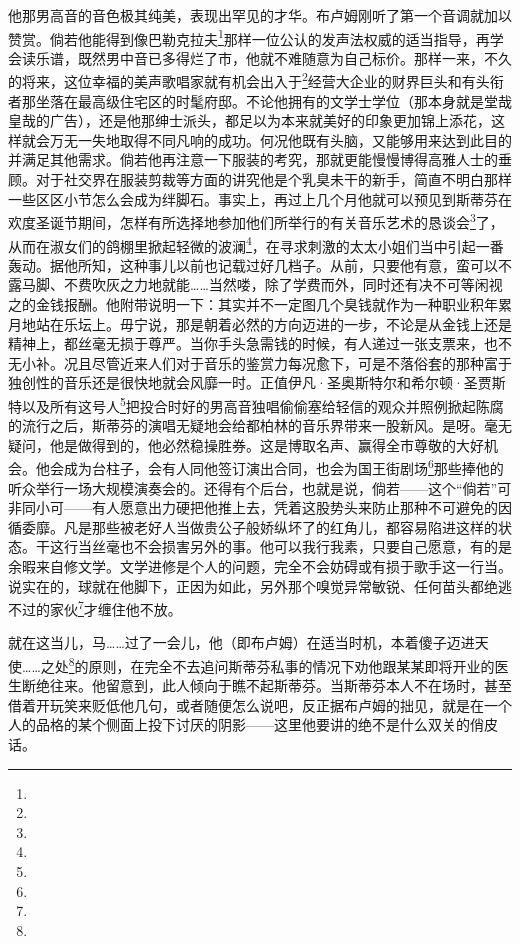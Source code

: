 \par 他那男高音的音色极其纯美，表现出罕见的才华。布卢姆刚听了第一个音调就加以赞赏。倘若他能得到像巴勒克拉夫\footnote{}那样一位公认的发声法权威的适当指导，再学会读乐谱，既然男中音已多得烂了市，他就不难随意为自己标价。那样一来，不久的将来，这位幸福的美声歌唱家就有机会出入于\footnote{}经营大企业的财界巨头和有头衔者那坐落在最高级住宅区的时髦府邸。不论他拥有的文学士学位（那本身就是堂哉皇哉的广告），还是他那绅士派头，都足以为本来就美好的印象更加锦上添花，这样就会万无一失地取得不同凡响的成功。何况他既有头脑，又能够用来达到此目的并满足其他需求。倘若他再注意一下服装的考究，那就更能慢慢博得高雅人士的垂顾。对于社交界在服装剪裁等方面的讲究他是个乳臭未干的新手，简直不明白那样一些区区小节怎么会成为绊脚石。事实上，再过上几个月他就可以预见到斯蒂芬在欢度圣诞节期间，怎样有所选择地参加他们所举行的有关音乐艺术的恳谈会\footnote{}了，从而在淑女们的鸽棚里掀起轻微的波澜\footnote{}，在寻求刺激的太太小姐们当中引起一番轰动。据他所知，这种事儿以前也记载过好几档子。从前，只要他有意，蛮可以不露马脚、不费吹灰之力地就能……当然喽，除了学费而外，同时还有决不可等闲视之的金钱报酬。他附带说明一下：其实并不一定图几个臭钱就作为一种职业积年累月地站在乐坛上。毋宁说，那是朝着必然的方向迈进的一步，不论是从金钱上还是精神上，都丝毫无损于尊严。当你手头急需钱的时候，有人递过一张支票来，也不无小补。况且尽管近来人们对于音乐的鉴赏力每况愈下，可是不落俗套的那种富于独创性的音乐还是很快地就会风靡一时。正值伊凡·圣奥斯特尔和希尔顿·圣贾斯特以及所有这号人\footnote{}把投合时好的男高音独唱偷偷塞给轻信的观众并照例掀起陈腐的流行之后，斯蒂芬的演唱无疑地会给都柏林的音乐界带来一股新风。是呀。毫无疑问，他是做得到的，他必然稳操胜券。这是博取名声、赢得全市尊敬的大好机会。他会成为台柱子，会有人同他签订演出合同，也会为国王街剧场\footnote{}那些捧他的听众举行一场大规模演奏会的。还得有个后台，也就是说，倘若——这个“倘若”可非同小可——有人愿意出力硬把他推上去，凭着这股势头来防止那种不可避免的因循委靡。凡是那些被老好人当做贵公子般娇纵坏了的红角儿，都容易陷进这样的状态。干这行当丝毫也不会损害另外的事。他可以我行我素，只要自己愿意，有的是余暇来自修文学。文学进修是个人的问题，完全不会妨碍或有损于歌手这一行当。说实在的，球就在他脚下，正因为如此，另外那个嗅觉异常敏锐、任何苗头都绝逃不过的家伙\footnote{}才缠住他不放。
\par 就在这当儿，马……过了一会儿，他（即布卢姆）在适当时机，本着傻子迈进天使……之处\footnote{}的原则，在完全不去追问斯蒂芬私事的情况下劝他跟某某即将开业的医生断绝往来。他留意到，此人倾向于瞧不起斯蒂芬。当斯蒂芬本人不在场时，甚至借着开玩笑来贬低他几句，或者随便怎么说吧，反正据布卢姆的拙见，就是在一个人的品格的某个侧面上投下讨厌的阴影——这里他要讲的绝不是什么双关的俏皮话。
